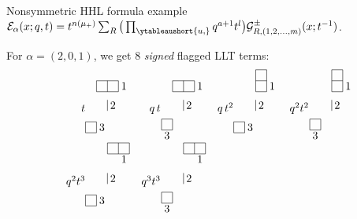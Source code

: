 \documentclass[dvipsnames]{beamer}
\newcommand{\Gcal}{{\mathcal G}}
\newcommand{\Ecal}{\mathcal{E}}
\theoremstyle{definition}
\newcounter{c}
\begin{document}
\begin{frame}{Nonsymmetric HHL formula example}
  \(\Ecal_\alpha(x;q,t) = t^{n(\mu_+)} \sum_R
  \big( \prod_{\ytableaushort{u,{}}} q^{a+1} t^l\big)
        \Gcal^\pm_{R,(1,2,\ldots,m)}(x;t^{-1})\).\pause

  For \(\alpha = (2,0,1)\), we get 8 \emph{signed} flagged LLT terms:\pause
\begin{equation*}
\setlength{\arraycolsep}{0cm}
\begin{array}{rcrcrcrcrcrcrcrc}
t  &
\begin{tikzpicture}[scale=.35,baseline=.85cm]
  \draw[yshift=4.25cm] (-2,0) grid (0,1); \node at (.5,4.75) {1};
  \draw[yshift=2.5cm] (-1.5,0) grid (-1.5,1); \node at (-.5,3) {2};
  \draw[yshift=.5cm] (-3,0) grid (-2,1); \node at (-1.5,1) {3};
\end{tikzpicture}
& \quad   q\, t  &
\begin{tikzpicture}[scale=.35,baseline=.85cm]
  \draw[yshift=4.25cm] (-2,0) grid (0,1); \node at (.5,4.75) {1};
  \draw[yshift=2.5cm] (-1,0) grid (-1,1); \node at (-.5,3) {2};
  \draw[yshift=.75cm] (-3,0) grid (-2,1); \node at (-2.5,.25) {3};
\end{tikzpicture}
& \quad  q\, t^{2} &
\begin{tikzpicture}[scale=.35,baseline=.85cm]
  \draw[yshift=4.25cm] (-1,0) grid (0,2); \node at (.5,4.75) {1};
  \draw[yshift=2.5cm] (-1,0) grid (-1,1); \node at (-.5,3) {2};
  \draw[yshift=.5cm] (-3,0) grid (-2,1); \node at (-1.5,1) {3};
\end{tikzpicture}
& \quad   q^{2} t^{2}  &
\begin{tikzpicture}[scale=.35,baseline=.85cm]
  \draw[yshift=4.25cm] (-1,0) grid (0,2); \node at (.5,4.75) {1};
  \draw[yshift=2.5cm] (-1,0) grid (-1,1); \node at (-.5,3) {2};
  \draw[yshift=.75cm] (-3,0) grid (-2,1); \node at (-2.5,.25) {3};
\end{tikzpicture} \\
\quad  q^{2} t^{3} &
\begin{tikzpicture}[scale=.35,baseline=.85cm]
  \draw[yshift=4.25cm] (-1,1) grid (1,2); \node at (.5,4.75) {1};
  \draw[yshift=2.5cm] (-1,0) grid (-1,1); \node at (-.5,3) {2};
  \draw[yshift=.5cm] (-3,0) grid (-2,1); \node at (-1.5,1) {3};
\end{tikzpicture}
& \quad  q^{3} t^{3}  &
\begin{tikzpicture}[scale=.35,baseline=.85cm]
  \draw[yshift=4.25cm] (-1,1) grid (1,2); \node at (.5,4.75) {1};
  \draw[yshift=2.5cm] (-1,0) grid (-1,1); \node at (-.5,3) {2};
  \draw[yshift=.75cm] (-2,0) grid (-3,1); \node at (-2.5,.25) {3};

\end{tikzpicture}
\end{array}
\end{equation*}
\end{frame}
\end{document}
